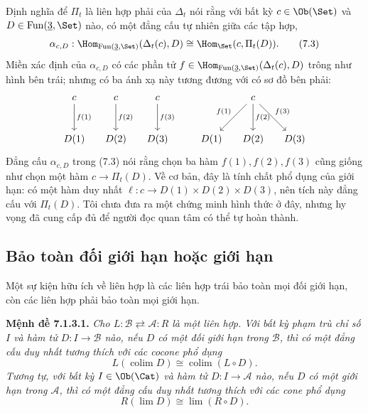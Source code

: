 Định nghĩa để $\Pi_t$ là liên hợp phải của $\Delta_t$ nói rằng với bất kỳ $c\in\Ob(\Set)$ và $D\in\operatorname{Fun}(\underline3,\Set)$ nào, có một đẳng cấu tự nhiên giữa các tập hợp,
\begin{equation}
\alpha_{c,D}:\Hom_{\operatorname{Fun}(\underline3,\Set)}(\Delta_t(c),D)\cong\Hom_{\Set}(c,\Pi_t(D)).\tag{7.3}
\end{equation}
Miền xác định của $\alpha_{c,D}$ có các phần tử $f\in\Hom_{\operatorname{Fun}(\underline3,\Set)}(\Delta_t(c),D)$ trông như hình bên trái; nhưng có ba ánh xạ này tương đương với có sơ đồ bên phải:
\[
\begin{tikzcd}[column sep=small,row sep=large]
c\arrow[d,"f(1)"]&c\arrow[d,"f(2)"]&c\arrow[d,"f(3)"]\\
D(1)&D(2)&D(3)
\end{tikzcd}
\qquad
\begin{tikzcd}[column sep=small,row sep=large]
&c\arrow[dl,"f(1)"']\arrow[d,"f(2)"]\arrow[dr,"f(3)"]&\\
D(1)&D(2)&D(3)
\end{tikzcd}
\]
Đẳng cấu $\alpha_{c,D}$ trong (7.3) nói rằng chọn ba hàm $f(1),f(2),f(3)$ cũng giống như chọn một hàm $c\to\Pi_t(D)$. Về cơ bản, đây là tính chất phổ dụng của giới hạn: có một hàm duy nhất $\ell:c\to D(1)\times D(2)\times D(3)$, nên tích này đẳng cấu với $\Pi_t(D)$. Tôi chưa đưa ra một chứng minh hình thức ở đây, nhưng hy vọng đã cung cấp đủ để người đọc quan tâm có thể tự hoàn thành.

\subsection{Bảo toàn đối giới hạn hoặc giới hạn}

Một sự kiện hữu ích về liên hợp là các liên hợp trái bảo toàn mọi đối giới hạn, còn các liên hợp phải bảo toàn mọi giới hạn.

\noindent\textbf{Mệnh đề 7.1.3.1.}\keepwithnext
\emph{Cho $L:\mathcal B\rightleftarrows\mathcal A:R$ là một liên hợp. Với bất kỳ phạm trù chỉ số $I$ và hàm tử $D:I\to\mathcal B$ nào, nếu $D$ có một đối giới hạn trong $\mathcal B$, thì có một đẳng cấu duy nhất tương thích với các cocone phổ dụng
\[
L(\operatorname{colim}D)\cong\operatorname{colim}(L\circ D).
\]
Tương tự, với bất kỳ $I\in\Ob(\Cat)$ và hàm tử $D:I\to\mathcal A$ nào, nếu $D$ có một giới hạn trong $\mathcal A$, thì có một đẳng cấu duy nhất tương thích với các cone phổ dụng
\[
R(\lim D)\cong\lim(R\circ D).
\]}

